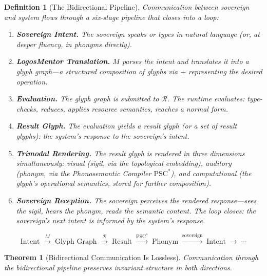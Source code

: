 \documentclass[12pt, letterpaper]{book}
\def\oplus{+}%
\def\mathfrak#1{#1}%
\newtheorem{theorem}{Theorem}[chapter]
\newtheorem{definition}{Definition}[chapter]
\begin{document}
\begin{definition}[The Bidirectional Pipeline]\label{def:bidir-pipeline}
Communication between sovereign and system flows through a six-stage pipeline that closes into a loop:
\begin{enumerate}[label=\textbf{Stage \arabic*:}, leftmargin=4em, nosep]
    \item \textbf{Sovereign Intent.} The sovereign speaks or types in natural language (or, at deeper fluency, in phonyms directly).
    \item \textbf{LogosMentor Translation.} $\mathfrak{M}$ parses the intent and translates it into a glyph graph---a structured composition of glyphs via $\oplus$ representing the desired operation.
    \item \textbf{Evaluation.} The glyph graph is submitted to $\mathcal{R}$. The runtime evaluates: type-checks, reduces, applies resource semantics, reaches a normal form.
    \item \textbf{Result Glyph.} The evaluation yields a result glyph (or a set of result glyphs): the system's response to the sovereign's intent.
    \item \textbf{Trimodal Rendering.} The result glyph is rendered in three dimensions simultaneously: visual (sigil, via the topological embedding), auditory (phonym, via the Phonosemantic Compiler $\mathrm{PSC}^*$), and computational (the glyph's operational semantics, stored for further composition).
    \item \textbf{Sovereign Reception.} The sovereign perceives the rendered response---sees the sigil, hears the phonym, reads the semantic content. The loop closes: the sovereign's next intent is informed by the system's response.
\end{enumerate}
\[
\text{Intent} \;\xrightarrow{\mathfrak{M}}\; \text{Glyph Graph} \;\xrightarrow{\mathcal{R}}\; \text{Result} \;\xrightarrow{\mathrm{PSC}^*}\; \text{Phonym} \;\xrightarrow{\text{sovereign}}\; \text{Intent} \;\to\; \cdots
\]
\end{definition}

\begin{theorem}[Bidirectional Communication Is Lossless]\label{thm:bidir-lossless}
Communication through the bidirectional pipeline preserves invariant structure in both directions.
\end{theorem}
\end{document}
